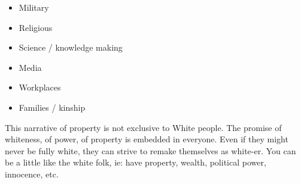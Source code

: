 \documentclass{report}
\begin{document}
\begin{description}
\begin{itemize}
                \begin{itemize}
                    \item Military
                    \item Religious
                    \item Science / knowledge making
                    \item Media
                    \item Workplaces
                    \item Families / kinship
                \end{itemize}
        \end{itemize}
        This narrative of property is not exclusive to
        White people. The promise of whiteness, of power, of
        property is embedded in everyone. Even if they might
        never be fully white, they can strive to remake themselves
        as white-er. You can be a little like the white folk, ie:
        have property, wealth, political power, innocence, etc.
    \item {\large }
\end{description}
\end{document}
